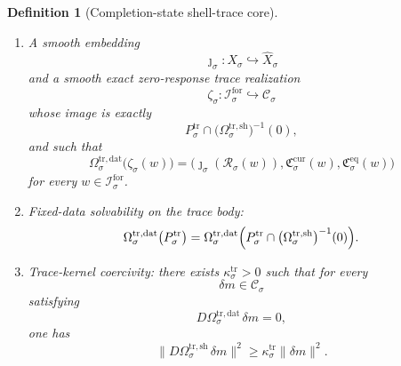 \documentclass[11pt]{article}
\newcommand{\ForSpace}[1]{\mathcal I_{#1}^{\mathrm{for}}}
\newcommand{\Reduction}[1]{\mathcal R_{#1}}
\newcommand{\CurrentCarrier}[1]{\mathfrak C_{#1}^{\mathrm{cur}}}
\newcommand{\EqCarrier}[1]{\mathfrak C_{#1}^{\mathrm{eq}}}
\newcommand{\VisibleAffine}[1]{\widehat X_{#1}}
\newcommand{\DataSpace}[1]{\mathcal Y_{#1}^{\mathrm{obs}}}
\newcommand{\AmbientTarget}[1]{E_{#1}^{\mathrm{amb}}}
\newcommand{\CoreState}[1]{\mathcal C_{#1}}
\newcommand{\GapSpace}[1]{H_{#1}}
\newcommand{\GapBody}[1]{D_{#1}}
\newcommand{\HiddenOperator}[1]{K_{#1}^{\mathrm{hid}}}
\newcommand{\TraceBody}[1]{P_{#1}^{\mathrm{tr}}}
\newcommand{\TraceDataMap}[1]{\Omega_{#1}^{\mathrm{tr,dat}}}
\newcommand{\TraceShellMap}[1]{\Omega_{#1}^{\mathrm{tr,sh}}}
\newcommand{\TraceSym}[1]{\mathbb K_{#1}^{\mathrm{tr}}}
\newcommand{\TraceTime}[1]{\tau_{#1}^{\mathrm{tr}}}
\newcommand{\TraceEmbed}[1]{\zeta_{#1}}
\newtheorem{definition}{Definition}
\begin{document}
\begin{definition}[Completion-state shell-trace core]
\begin{enumerate}
\[    O(\DataSpace{\sigma})\times
    O(\AmbientTarget{\sigma})\times
    O(\GapSpace{\sigma})
    \]
    and an orthogonal involution
    \[
    \TraceTime{\sigma}\in
    O(\CoreState{\sigma})\times
    O(\DataSpace{\sigma})\times
    O(\AmbientTarget{\sigma})\times
    O(\GapSpace{\sigma})
    \]
    preserving \(\TraceBody{\sigma}\), the exact zero-response trace slice
    \[
    \TraceBody{\sigma}\cap\bigl(\TraceShellMap{\sigma}\bigr)^{-1}(0),
    \]
    the hidden body \(\GapBody{\sigma}\), and \(\HiddenOperator{\sigma}\), and satisfying
    \[
    \TraceDataMap{\sigma}(g_{\mathrm{st}}m)
    =
    g_{\mathrm{dat}}\TraceDataMap{\sigma}(m),
    \qquad
    \TraceShellMap{\sigma}(g_{\mathrm{st}}m)
    =
    g_{\mathrm{sh}}\TraceShellMap{\sigma}(m)
    \]
    for every \(m\in\CoreState{\sigma}\) and every
    \[
    (g_{\mathrm{st}},g_{\mathrm{dat}},g_{\mathrm{sh}},g_{\mathrm{hid}})
    \in\TraceSym{\sigma},
    \]
    with the analogous intertwining equalities for the components of \(\TraceTime{\sigma}\).
    \item A smooth embedding
    \[
    \jmath_{\sigma}:X_{\sigma}\hookrightarrow\VisibleAffine{\sigma}
    \]
    and a smooth exact zero-response trace realization
    \[
    \TraceEmbed{\sigma}:\ForSpace{\sigma}\hookrightarrow\CoreState{\sigma}
    \]
    whose image is exactly
    \[
    \TraceBody{\sigma}\cap
    \bigl(\TraceShellMap{\sigma}\bigr)^{-1}(0),
    \]
    and such that
    \begin{equation}
    \TraceDataMap{\sigma}\bigl(\TraceEmbed{\sigma}(w)\bigr)
    =
    \bigl(
    \jmath_{\sigma}(\Reduction{\sigma}(w)),
    \CurrentCarrier{\sigma}(w),
    \EqCarrier{\sigma}(w)
    \bigr)
    \label{eq:tracecompat}
    \end{equation}
    for every \(w\in\ForSpace{\sigma}\).
    \item Fixed-data solvability on the trace body:
    \begin{equation}
    \TraceDataMap{\sigma}\bigl(\TraceBody{\sigma}\bigr)
    =
    \TraceDataMap{\sigma}
    \Bigl(
    \TraceBody{\sigma}\cap
    \bigl(\TraceShellMap{\sigma}\bigr)^{-1}(0)
    \Bigr).
    \label{eq:tracesolvability}
    \end{equation}
    \item Trace-kernel coercivity: there exists \(\kappa_{\sigma}^{\mathrm{tr}}>0\) such that for every
    \[
    \delta m\in\CoreState{\sigma}
    \]
    satisfying
    \[
    D\TraceDataMap{\sigma}\,\delta m=0,
    \]
    one has
    \begin{equation}
    \bigl\|
    D\TraceShellMap{\sigma}\,\delta m
    \bigr\|^{2}
    \ge
    \kappa_{\sigma}^{\mathrm{tr}}\|\delta m\|^{2}.
    \label{eq:tracecoercive}
    \end{equation}
\end{enumerate}
\end{definition}
\end{document}
